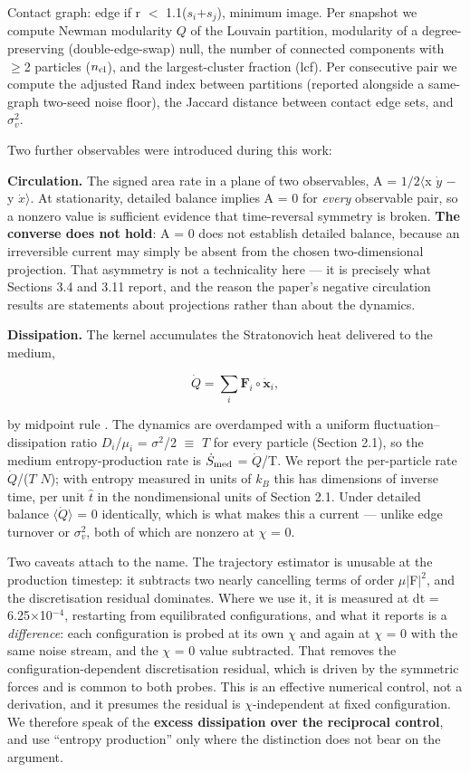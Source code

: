 \documentclass[aps,pre,preprint,superscriptaddress,nofootinbib,longbibliography]{revtex4-2}
\begin{document}
Contact graph: edge if r $<$ 1.1($s_{i}$+$s_{j}$), minimum image. Per snapshot we compute Newman modularity $Q$ \cite{r3} of the Louvain partition, modularity of a degree-preserving (double-edge-swap) null, the number of connected components with $\ge$2 particles ($n_{\rm cl}$), and the largest-cluster fraction (lcf). Per consecutive pair we compute the adjusted Rand index between partitions (reported alongside a same-graph two-seed noise floor), the Jaccard distance between contact edge sets, and $\sigma^2_v$.

Two further observables were introduced during this work:

\textbf{Circulation.} The signed area rate in a plane of two observables, A = $1/2 \langle$x $\dot{y}$ $-$ y $\dot{x} \rangle$. At stationarity, detailed balance implies A = 0 for \emph{every} observable pair, so a nonzero value is sufficient evidence that time-reversal symmetry is broken. \textbf{The converse does not hold}: A = 0 does not establish detailed balance, because an irreversible current may simply be absent from the chosen two-dimensional projection. That asymmetry is not a technicality here --- it is precisely what Sections 3.4 and 3.11 report, and the reason the paper's negative circulation results are statements about projections rather than about the dynamics.

\textbf{Dissipation.} The kernel accumulates the Stratonovich heat delivered to the medium,

\begin{equation}
\dot Q=\sum_i \mathbf{F}_i\circ\dot{\mathbf{x}}_i,
\end{equation}

by midpoint rule \cite{r5,r26}. The dynamics are overdamped with a uniform fluctuation--dissipation ratio $D_{i}$/$\mu_{i}$ = $\sigma ^{2}$/2 $\equiv$ $T$ for every particle (Section 2.1), so the medium entropy-production rate is $\dot S_{\rm med}$ = $\dot{Q}$/T. We report the per-particle rate $\dot{Q}$/($T$ $N$); with entropy measured in units of $k_B$ this has dimensions of inverse time, per unit $\hat{t}$ in the nondimensional units of Section 2.1. Under detailed balance $\langle \dot{Q} \rangle$ = 0 identically, which is what makes this a current --- unlike edge turnover or $\sigma^2_v$, both of which are nonzero at $\chi$ = 0.

Two caveats attach to the name. The trajectory estimator is unusable at the production timestep: it subtracts two nearly cancelling terms of order $\mu |$F$| ^{2}$, and the discretisation residual dominates. Where we use it, it is measured at dt = 6.25$\times$10$^{-4}$, restarting from equilibrated configurations, and what it reports is a \emph{difference}: each configuration is probed at its own $\chi$ and again at $\chi$ = 0 with the same noise stream, and the $\chi$ = 0 value subtracted. That removes the configuration-dependent discretisation residual, which is driven by the symmetric forces and is common to both probes. This is an effective numerical control, not a derivation, and it presumes the residual is $\chi$-independent at fixed configuration. We therefore speak of the \textbf{excess dissipation over the reciprocal control}, and use ``entropy production'' only where the distinction does not bear on the argument.
\end{document}
